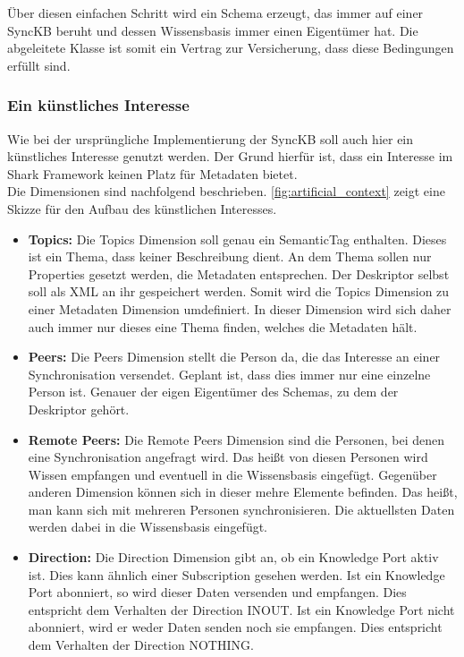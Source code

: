 \documentclass[a4paper]{article}
\begin{document}
	Über diesen einfachen Schritt wird ein Schema erzeugt, das immer auf einer
	SyncKB beruht und dessen Wissensbasis immer einen Eigentümer hat. Die
	abgeleitete Klasse ist somit ein Vertrag zur Versicherung, dass diese
	Bedingungen erfüllt sind.
	
	\subsubsection{Ein künstliches Interesse}
	\label{sec:artificial_interest}
	
	Wie bei der ursprüngliche Implementierung der SyncKB soll auch hier ein
	künstliches Interesse genutzt werden. Der Grund hierfür ist, dass ein
	Interesse im Shark Framework keinen Platz für Metadaten bietet. \\
	
	Die Dimensionen sind nachfolgend beschrieben. \autoref{fig:artificial_context}
	zeigt eine Skizze für den Aufbau des künstlichen Interesses.
	
	\begin{itemize}
		\item \textbf{Topics:} Die Topics Dimension soll genau ein SemanticTag
		enthalten. Dieses ist ein Thema, dass keiner Beschreibung
		dient. An dem Thema sollen nur Properties gesetzt werden, die Metadaten
		entsprechen. Der Deskriptor selbst soll als XML an ihr gespeichert werden.
		Somit wird die Topics Dimension zu einer Metadaten Dimension umdefiniert.
		In dieser Dimension wird sich daher auch immer nur dieses eine Thema finden,
		welches die Metadaten hält.
		\item \textbf{Peers:}  Die Peers Dimension stellt die Person da, die das
		Interesse an einer Synchronisation versendet. Geplant ist, dass dies
		immer nur eine einzelne Person ist. Genauer der eigen Eigentümer
		des Schemas, zu dem der Deskriptor gehört.
		\item \textbf{Remote Peers:} Die Remote Peers Dimension sind die Personen,
		bei denen eine Synchronisation angefragt wird. Das heißt von diesen
		Personen wird Wissen empfangen und eventuell in die Wissensbasis eingefügt.
		Gegenüber anderen Dimension können sich in dieser mehre Elemente befinden.
		Das heißt, man kann sich mit mehreren Personen synchronisieren.
		Die aktuellsten Daten werden dabei in die Wissensbasis eingefügt.
		\item \textbf{Direction:} Die Direction Dimension gibt an, ob ein 
		Knowledge Port aktiv ist. Dies kann ähnlich einer Subscription gesehen
		werden.	Ist ein Knowledge Port abonniert, so wird dieser Daten versenden 
		und	empfangen. Dies entspricht dem Verhalten der Direction INOUT. Ist ein
		Knowledge Port nicht abonniert, wird er weder Daten senden noch sie
		empfangen. Dies entspricht dem Verhalten der Direction NOTHING.
	\end{itemize} 	
	
\end{document}
